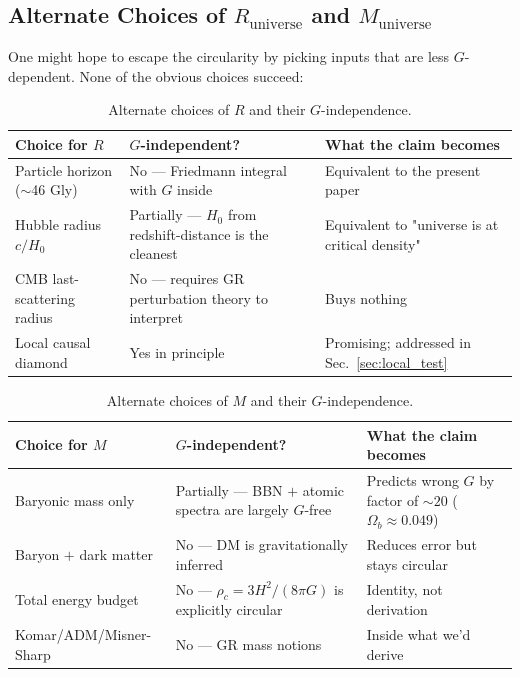 \documentclass[11pt,letterpaper]{article}
\newcommand{\Runiv}{R_{\mathrm{universe}}}
\newcommand{\Muniv}{M_{\mathrm{universe}}}
\begin{document}
\subsection{Alternate Choices of $\Runiv$ and $\Muniv$}

One might hope to escape the circularity by picking inputs that are
less $G$-dependent. None of the obvious choices succeed:

\begin{table}[H]
  \centering
  \caption[Alternate choices of R and their G-independence.]{Alternate choices of $R$ and their $G$-independence.}
  \label{tab:R_choices}
  \begin{tabular}{p{4.4cm}p{3.4cm}p{6cm}}
    \toprule
    Choice for $R$ & $G$-independent? & What the claim becomes \\
    \midrule
    Particle horizon ($\sim$46 Gly) & No --- Friedmann integral with $G$ inside & Equivalent to the present paper \\
    Hubble radius $c/H_0$ & Partially --- $H_0$ from redshift-distance is the cleanest & Equivalent to "universe is at critical density" \\
    CMB last-scattering radius & No --- requires GR perturbation theory to interpret & Buys nothing \\
    Local causal diamond & Yes in principle & Promising; addressed in Sec.~\ref{sec:local_test} \\
    \bottomrule
  \end{tabular}
\end{table}

\begin{table}[H]
  \centering
  \caption[Alternate choices of M and their G-independence.]{Alternate choices of $M$ and their $G$-independence.}
  \label{tab:M_choices}
  \begin{tabular}{p{4.4cm}p{3.4cm}p{6cm}}
    \toprule
    Choice for $M$ & $G$-independent? & What the claim becomes \\
    \midrule
    Baryonic mass only & Partially --- BBN $+$ atomic spectra are largely $G$-free & Predicts wrong $G$ by factor of $\sim 20$ ($\Omega_b \approx 0.049$) \\
    Baryon $+$ dark matter & No --- DM is gravitationally inferred & Reduces error but stays circular \\
    Total energy budget & No --- $\rho_c = 3H^2/(8\pi G)$ is explicitly circular & Identity, not derivation \\
    Komar/ADM/Misner-Sharp & No --- GR mass notions & Inside what we'd derive \\
    \bottomrule
  \end{tabular}
\end{table}
\end{document}
